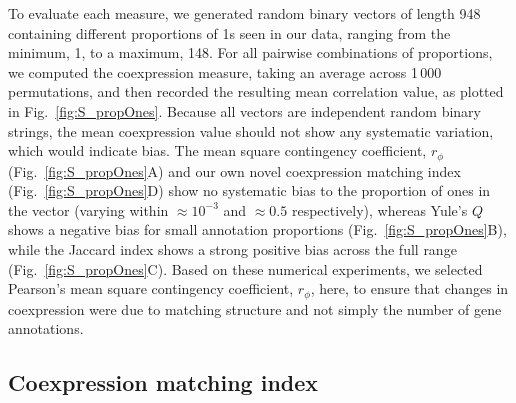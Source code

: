 \documentclass[10pt,letterpaper]{article}
\begin{document}
{To evaluate each measure, we generated random binary vectors of length 948 containing different proportions of 1s seen in our data, ranging from the minimum, 1, to a maximum, 148.
For all pairwise combinations of proportions, we computed the coexpression measure, taking an average across 1\,000 permutations, and then recorded the resulting mean correlation value, as plotted in Fig.~\ref{fig:S_propOnes}.
Because all vectors are independent random binary strings, the mean coexpression value should not show any systematic variation, which would indicate bias.
The mean square contingency coefficient, $r_\phi$ (Fig.~\ref{fig:S_propOnes}A) and our own novel coexpression matching index (Fig.~\ref{fig:S_propOnes}D) show no systematic bias to the proportion of ones in the vector (varying within $\approx 10^{-3}$ and $\approx 0.5$ respectively), whereas Yule's $Q$ shows a negative bias for small annotation proportions (Fig.~\ref{fig:S_propOnes}B), while the Jaccard index shows a strong positive bias across the full range (Fig.~\ref{fig:S_propOnes}C).
Based on these numerical experiments, we selected Pearson's mean square contingency coefficient, $r_\phi$, here, to ensure that changes in coexpression were due to matching structure and not simply the number of gene annotations.


\subsection*{Coexpression matching index}

}
\end{document}
